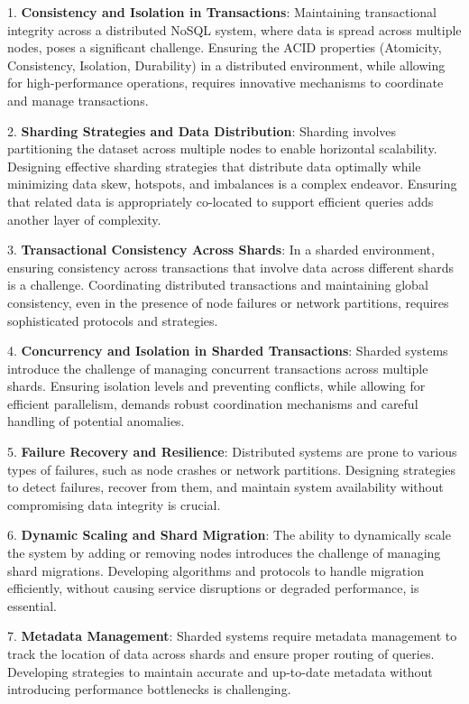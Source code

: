 \documentclass[sigconf]{acmart}
\begin{document}
1. \textbf{Consistency and Isolation in Transactions}: Maintaining transactional integrity across a distributed NoSQL system, where data is spread across multiple nodes, poses a significant challenge. Ensuring the ACID properties (Atomicity, Consistency, Isolation, Durability) in a distributed environment, while allowing for high-performance operations, requires innovative mechanisms to coordinate and manage transactions.

2. \textbf{Sharding Strategies and Data Distribution}: Sharding involves partitioning the dataset across multiple nodes to enable horizontal scalability. Designing effective sharding strategies that distribute data optimally while minimizing data skew, hotspots, and imbalances is a complex endeavor. Ensuring that related data is appropriately co-located to support efficient queries adds another layer of complexity.

3. \textbf{Transactional Consistency Across Shards}: In a sharded environment, ensuring consistency across transactions that involve data across different shards is a challenge. Coordinating distributed transactions and maintaining global consistency, even in the presence of node failures or network partitions, requires sophisticated protocols and strategies.

4. \textbf{Concurrency and Isolation in Sharded Transactions}: Sharded systems introduce the challenge of managing concurrent transactions across multiple shards. Ensuring isolation levels and preventing conflicts, while allowing for efficient parallelism, demands robust coordination mechanisms and careful handling of potential anomalies.

5. \textbf{Failure Recovery and Resilience}: Distributed systems are prone to various types of failures, such as node crashes or network partitions. Designing strategies to detect failures, recover from them, and maintain system availability without compromising data integrity is crucial.

6. \textbf{Dynamic Scaling and Shard Migration}: The ability to dynamically scale the system by adding or removing nodes introduces the challenge of managing shard migrations. Developing algorithms and protocols to handle migration efficiently, without causing service disruptions or degraded performance, is essential.

7. \textbf{Metadata Management}: Sharded systems require metadata management to track the location of data across shards and ensure proper routing of queries. Developing strategies to maintain accurate and up-to-date metadata without introducing performance bottlenecks is challenging.
\end{document}
